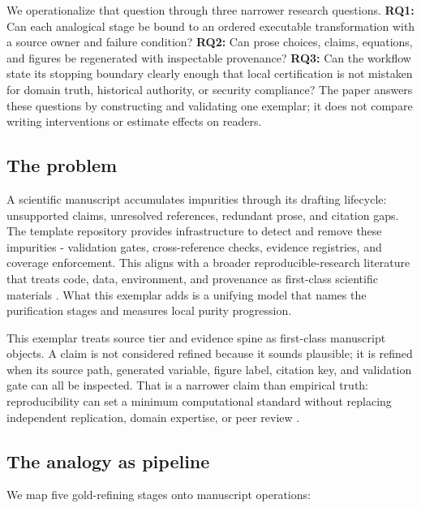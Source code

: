 \documentclass[
  english,
]{article}
\begin{document}
We operationalize that question through three narrower research
questions. \textbf{RQ1:} Can each analogical stage be bound to an
ordered executable transformation with a source owner and failure
condition? \textbf{RQ2:} Can prose choices, claims, equations, and
figures be regenerated with inspectable provenance? \textbf{RQ3:} Can
the workflow state its stopping boundary clearly enough that local
certification is not mistaken for domain truth, historical authority, or
security compliance? The paper answers these questions by constructing
and validating one exemplar; it does not compare writing interventions
or estimate effects on readers.

\subsection{The problem}\label{the-problem}

A scientific manuscript accumulates impurities through its drafting
lifecycle: unsupported claims, unresolved references, redundant prose,
and citation gaps. The template repository provides infrastructure to
detect and remove these impurities - validation gates, cross-reference
checks, evidence registries, and coverage enforcement. This aligns with
a broader reproducible-research literature that treats code, data,
environment, and provenance as first-class scientific materials
\citep{buckheit_donoho_1995, peng2011reproducible, stodden2011default, sandve2013ten}.
What this exemplar adds is a unifying model that names the purification
stages and measures local purity progression.

This exemplar treats source tier and evidence spine as first-class
manuscript objects. A claim is not considered refined because it sounds
plausible; it is refined when its source path, generated variable,
figure label, citation key, and validation gate can all be inspected.
That is a narrower claim than empirical truth: reproducibility can set a
minimum computational standard without replacing independent
replication, domain expertise, or peer review
\citep{peng2011reproducible, ioannidis2005false}.

\subsection{The analogy as pipeline}\label{the-analogy-as-pipeline}

We map five gold-refining stages onto manuscript operations:
\end{document}
